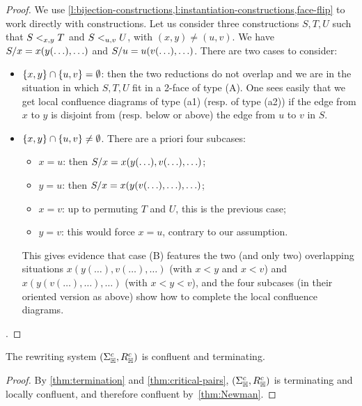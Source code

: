 \begin{proof}
  We use \cref{l:bijection-constructions,l:instantiation-constructions,face-flip} to work directly with constructions. 
Let us consider three constructions $S,T,U$ such that $S<_{x,y}T$ and $S <_{u,v} U$, with $(x,y)\neq(u,v)$.
  We have~$S/x=x(y(\ldots),\ldots)$ and $S/u=u(v(\ldots),\ldots)$. 
  There are two cases to consider:
  \begin{itemize}
  \item[(A)] $\left\{x,y\right\}\cap\left\{u,v\right\}=\emptyset$: then the two reductions do not overlap and we are in the situation in which $S,T,U$ fit in a 2-face of type (A).  One sees easily that we get local confluence diagrams of type (a1) (resp. of type (a2)) if the edge from $x$ to $y$ is disjoint from (resp. below or above) the edge  from $u$ to $v$ in $S$. 
  \item[(B)] $\left\{x,y\right\}\cap\left\{u,v\right\}\neq\emptyset$. 
  There are a priori four subcases:
  \begin{itemize}
  \item $x=u$: then $S/x=x(y(\ldots),v(\ldots),\ldots)$;
  \item $y=u$: then  $S/x=x(y(v(\ldots),\ldots),\ldots)$;
  \item $x=v$: up to permuting $T$ and $U$, this is the previous case;
  \item $y=v$: this would force $x=u$, contrary to our assumption.
  \end{itemize}
  This gives evidence that case (B) features the two (and only two) overlapping situations $x(y(\ldots),v(\ldots),\ldots)$ (with $x<y$ and $x<v$) and 
  $x(y(v(\ldots),\ldots),\ldots)$ (with $x<y<v$), and the four subcases  (in their oriented version as above) show how to complete the local confluence diagrams.  
\end{itemize}.
\end{proof}

\begin{samepage}
\begin{theorem}
  \label{thm:confluent}
  The rewriting system $(\Sigma_{\mathbb H}^c ,R_{\mathbb H}^c)$ is confluent and terminating.
\end{theorem}
\begin{proof}
  By \cref{thm:termination} and \cref{thm:critical-pairs}, $(\Sigma_{\mathbb H}^c,R_{\mathbb H}^c)$ is terminating and locally confluent, and therefore confluent by~\cref{thm:Newman}.
\end{proof}
\end{samepage}

